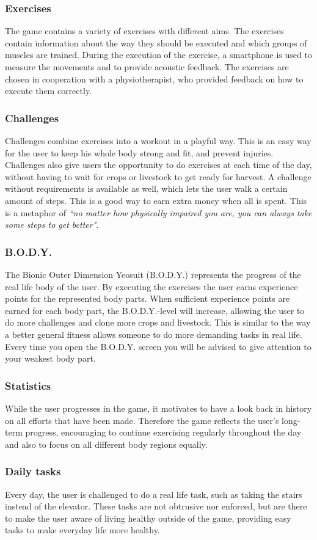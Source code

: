 \subsubsection{Exercises}
The game contains a variety of exercises with different aims. The exercises contain information about the way they should be executed and which groups of muscles are trained. During the execution of the exercise, a smartphone is used to measure the movements and to provide acoustic feedback. The exercises are chosen in cooperation with a physiotherapist, who provided feedback on how to execute them correctly.

\subsubsection{Challenges}
Challenges combine exercises into a workout in a playful way. This is an easy way for the user to keep his whole body strong and fit, and prevent injuries. Challenges also give users the opportunity to do exercises at each time of the day, without having to wait for crops or livestock to get ready for harvest. A challenge without requirements is available as well, which lets the user walk a certain amount of steps. This is a good way to earn extra money when all is spent. This is a metaphor of \emph{``no matter how physically impaired you are, you can always take some steps to get better"}. 

\subsubsection{B.O.D.Y.}
The Bionic Outer Dimension Yeosuit (B.O.D.Y.) represents the progress of the real life body of the user. By executing the exercises the user earns experience points for the represented body parts. When sufficient experience points are earned for each body part, the B.O.D.Y.-level will increase, allowing the user to do more challenges and clone more crops and livestock. This is similar to the way a better general fitness allows someone to do more demanding tasks in real life. Every time you open the B.O.D.Y. screen you will be advised to give attention to your weakest body part.

\subsubsection{Statistics}
While the user progresses in the game, it motivates to have a look back in history on all efforts that have been made. Therefore the game reflects the user's long-term progress, encouraging to continue exercising regularly throughout the day and also to focus on all different body regions equally. 

\subsubsection{Daily tasks}
Every day, the user is challenged to do a real life task, such as taking the stairs instead of the elevator. These tasks are not obtrusive nor enforced, but are there to make the user aware of living healthy outside of the game, providing easy tasks to make everyday life more healthy. 
